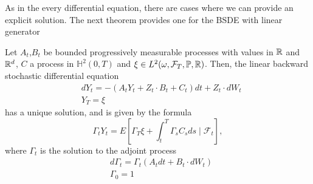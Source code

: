 As in the every differential equation, there are cases where we can provide an explicit solution. The next theorem provides one for the BSDE with linear generator
\begin{theorem}
	\label{thm:linearBSDE}
	Let $A_t$,$B_t$ be bounded progressively measurable processes with values in $\mathbb{R}$ and $\mathbb{R}^d$, $C$ a process in $\mathbb{H}^2(0,T)$ and $\xi \in L^2(\omega,\mathcal{F}_T,\mathbb{P},\mathbb{R})$. Then, the linear backward stochastic differential equation
	\begin{equation}
		\begin{split}
			&dY_t=-(A_tY_t+Z_t\cdot B_t+C_t)dt+Z_t\cdot dW_t\\
			&Y_T=\xi
		\end{split}
	\end{equation}
	has a unique solution, and is given by the formula
	\begin{equation}
		\Gamma_t Y_t=E\left[\Gamma_T \xi+\int_t^T \Gamma_s C_s d s \mid \mathcal{F}_t\right],
	\end{equation}
	where $\Gamma_t$ is the solution to the adjoint process
	\begin{equation}
		\begin{split}
			&d\Gamma_t=\Gamma_t(A_tdt+B_t\cdot dW_t)\\
			&\Gamma_0=1
		\end{split}
	\end{equation}	
\end{theorem}
